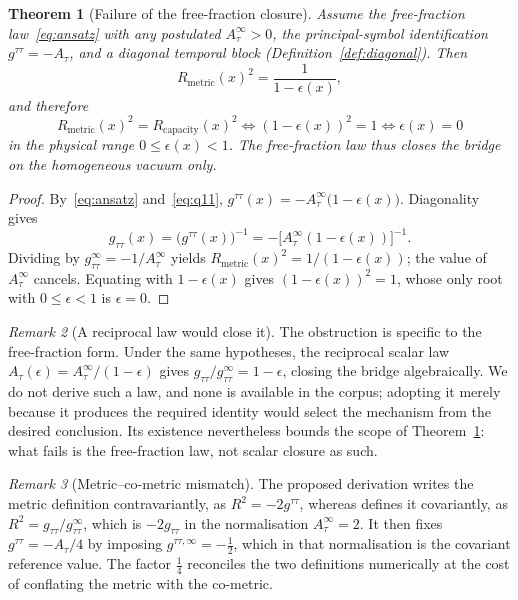 \documentclass[12pt,a4paper]{article}
\newtheorem{theorem}{Theorem}[section]
\theoremstyle{remark}
\newtheorem{remark}[theorem]{Remark}
\theoremstyle{definition}
\begin{document}
    \begin{theorem}[Failure of the free-fraction closure]
      \label{thm:nogo}
      Assume the free-fraction law~\eqref{eq:ansatz} with any postulated $A_{\tau}^{\infty}>0$, the
      principal-symbol identification $g^{\tau\tau}=-A_{\tau}$, and a diagonal temporal block
      (Definition~\ref{def:diagonal}).
      Then
      \[
        R_{\mathrm{metric}}(x)^{2}=\frac{1}{1-\epsilon(x)} ,
      \]
      and therefore
      \[
        R_{\mathrm{metric}}(x)^{2}=R_{\mathrm{capacity}}(x)^{2}
        \iff (1-\epsilon(x))^{2}=1
        \iff \epsilon(x)=0
      \]
      in the physical range $0\le\epsilon(x)<1$.
      The free-fraction law thus closes the bridge on the homogeneous vacuum only.
    \end{theorem}

    \begin{proof}
      By~\eqref{eq:ansatz} and~\eqref{eq:q11},
      $g^{\tau\tau}(x)=-A_{\tau}^{\infty}\bigl(1-\epsilon(x)\bigr)$.
      Diagonality gives
      \[
        g_{\tau\tau}(x)=\bigl(g^{\tau\tau}(x)\bigr)^{-1}=-\bigl[A_{\tau}^{\infty}(1-\epsilon(x))\bigr]^{-1}.
      \]
      Dividing by $g_{\tau\tau}^{\infty}=-1/A_{\tau}^{\infty}$ yields
      $R_{\mathrm{metric}}(x)^{2}=1/(1-\epsilon(x))$; the value of $A_{\tau}^{\infty}$ cancels.
      Equating with $1-\epsilon(x)$ gives $(1-\epsilon(x))^{2}=1$, whose only root with
      $0\le\epsilon<1$ is $\epsilon=0$.
    \end{proof}

    \begin{remark}[A reciprocal law would close it]
      \label{rem:reciprocal}
      The obstruction is specific to the free-fraction form.
      Under the same hypotheses, the reciprocal scalar law
      $A_{\tau}(\epsilon)=A_{\tau}^{\infty}/(1-\epsilon)$ gives
      $g_{\tau\tau}/g_{\tau\tau}^{\infty}=1-\epsilon$, closing the bridge algebraically.
      We do not derive such a law, and none is available in the corpus; adopting it merely because it
      produces the required identity would select the mechanism from the desired conclusion.
      Its existence nevertheless bounds the scope of Theorem~\ref{thm:nogo}: what fails is the
      free-fraction law, not scalar closure as such.
    \end{remark}

    \begin{remark}[Metric--co-metric mismatch]
      \label{rem:where}
      The proposed derivation writes the metric definition contravariantly, as
      $R^{2}=-2g^{\tau\tau}$, whereas
      \cite{Beau2026lco2} defines it covariantly, as
      $R^{2}=g_{\tau\tau}/g_{\tau\tau}^{\infty}$, which is $-2g_{\tau\tau}$ in the normalisation
      $A_{\tau}^{\infty}=2$.
      It then fixes $g^{\tau\tau}=-A_{\tau}/4$ by imposing $g^{\tau\tau,\infty}=-\tfrac12$, which in that
      normalisation is the covariant reference value.
      The factor $\tfrac14$ reconciles the two definitions numerically at the cost of conflating the
      metric with the co-metric.
    \end{remark}
\end{document}
